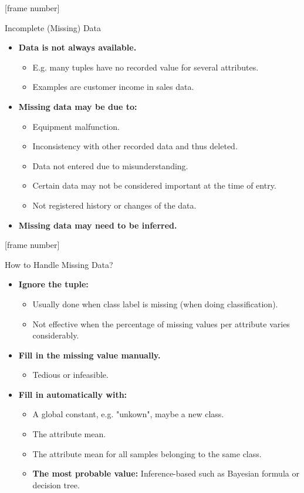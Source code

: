\documentclass[aspectratio=169,t]{beamer}
\begin{document}
  {
    [frame number]
    \begin{frame}{Incomplete (Missing) Data}
    \begin{itemize}
      \item \textbf{Data is not always available.}
      \begin{itemize}
        \item E.g. many tuples have no recorded value for several attributes.
        \item Examples are customer income in sales data.
      \end{itemize}
      \item \textbf{Missing data may be due to:}
      \begin{itemize}
        \item Equipment malfunction.
        \item Inconsistency with other recorded data and thus deleted.
        \item Data not entered due to misunderstanding.
        \item Certain data may not be considered important at the time of entry.
        \item Not registered history or changes of the data.
      \end{itemize}
      \item \textbf{Missing data may need to be inferred.}
    \end{itemize}
    \end{frame}
  }

  {
    [frame number]
    \begin{frame}{How to Handle Missing Data?}
    \begin{itemize}
      \item \textbf{Ignore the tuple:}
      \begin{itemize}
        \item Usually done when class label is missing (when doing classification).
        \item Not effective when the percentage of missing values per attribute varies considerably.
      \end{itemize}
      \item \textbf{Fill in the missing value manually.}
      \begin{itemize}
        \item Tedious or infeasible.
      \end{itemize}
      \item \textbf{Fill in automatically with:}
      \begin{itemize}
        \item A global constant, e.g. "unkown", maybe a new class.
        \item The attribute mean.
        \item The attribute mean for all samples belonging to the same class.
        \item \textbf{\color{airforceblue} The most probable value:} Inference-based such as Bayesian formula or decision tree.
      \end{itemize}
    \end{itemize}
    \end{frame}
  }
\end{document}
